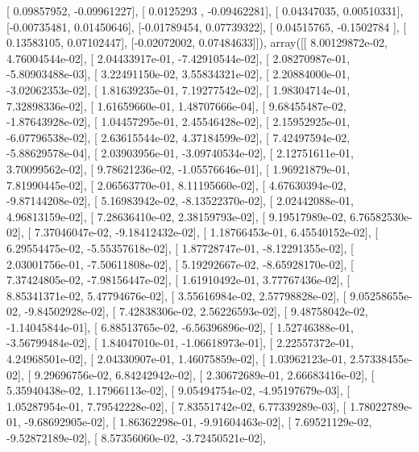 \documentclass{article}
\begin{document}
       [ 0.09857952, -0.09961227],
       [ 0.0125293 , -0.09462281],
       [ 0.04347035,  0.00510331],
       [-0.00735481,  0.01450646],
       [-0.01789454,  0.07739322],
       [ 0.04515765, -0.1502784 ],
       [ 0.13583105,  0.07102447],
       [-0.02072002,  0.07484633]]), array([[  8.00129872e-02,   4.76004544e-02],
       [  2.04433917e-01,  -7.42910544e-02],
       [  2.08270987e-01,  -5.80903488e-03],
       [  3.22491150e-02,   3.55834321e-02],
       [  2.20884000e-01,  -3.02062353e-02],
       [  1.81639235e-01,   7.19277542e-02],
       [  1.98304714e-01,   7.32898336e-02],
       [  1.61659660e-01,   1.48707666e-04],
       [  9.68455487e-02,  -1.87643928e-02],
       [  1.04457295e-01,   2.45546428e-02],
       [  2.15952925e-01,  -6.07796538e-02],
       [  2.63615544e-02,   4.37184599e-02],
       [  7.42497594e-02,  -5.88629578e-04],
       [  2.03903956e-01,  -3.09740534e-02],
       [  2.12751611e-01,   3.70099562e-02],
       [  9.78621236e-02,  -1.05576646e-01],
       [  1.96921879e-01,   7.81990445e-02],
       [  2.06563770e-01,   8.11195660e-02],
       [  4.67630394e-02,  -9.87144208e-02],
       [  5.16983942e-02,  -8.13522370e-02],
       [  2.02442088e-01,   4.96813159e-02],
       [  7.28636410e-02,   2.38159793e-02],
       [  9.19517989e-02,   6.76582530e-02],
       [  7.37046047e-02,  -9.18412432e-02],
       [  1.18766453e-01,   6.45540152e-02],
       [  6.29554475e-02,  -5.55357618e-02],
       [  1.87728747e-01,  -8.12291355e-02],
       [  2.03001756e-01,  -7.50611808e-02],
       [  5.19292667e-02,  -8.65928170e-02],
       [  7.37424805e-02,  -7.98156447e-02],
       [  1.61910492e-01,   3.77767436e-02],
       [  8.85341371e-02,   5.47794676e-02],
       [  3.55616984e-02,   2.57798828e-02],
       [  9.05258655e-02,  -9.84502928e-02],
       [  7.42838306e-02,   2.56226593e-02],
       [  9.48758042e-02,  -1.14045844e-01],
       [  6.88513765e-02,  -6.56396896e-02],
       [  1.52746388e-01,  -3.56799484e-02],
       [  1.84047010e-01,  -1.06618973e-01],
       [  2.22557372e-01,   4.24968501e-02],
       [  2.04330907e-01,   1.46075859e-02],
       [  1.03962123e-01,   2.57338455e-02],
       [  9.29696756e-02,   6.84242942e-02],
       [  2.30672689e-01,   2.66683416e-02],
       [  5.35940438e-02,   1.17966113e-02],
       [  9.05494754e-02,  -4.95197679e-03],
       [  1.05287954e-01,   7.79542228e-02],
       [  7.83551742e-02,   6.77339289e-03],
       [  1.78022789e-01,  -9.68692905e-02],
       [  1.86362298e-01,  -9.91604463e-02],
       [  7.69521129e-02,  -9.52872189e-02],
       [  8.57356060e-02,  -3.72450521e-02],
\end{document}
